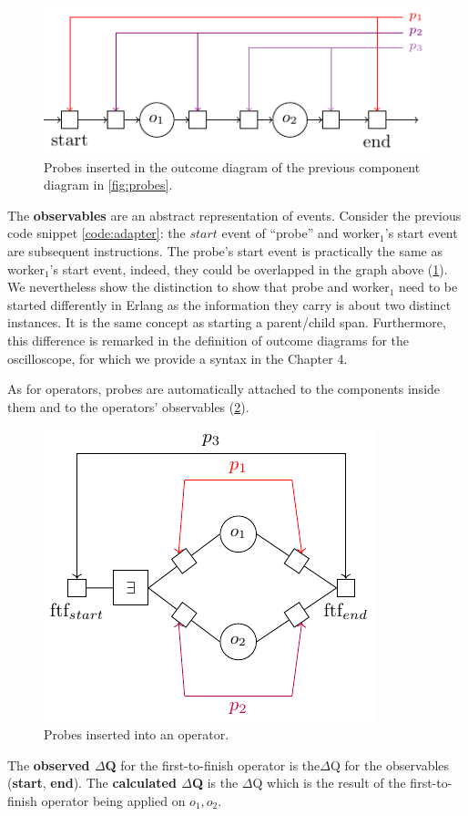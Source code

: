         \begin{figure}[H]
            \begin{center}
                \includegraphics[scale=1.3]{tikz/probe_1.pdf}
            \end{center}
            \caption{Probes inserted in the outcome diagram of the previous component diagram in \cref{fig:probes}.}
            \label{fig:probes_o}
        \end{figure}
       
    The \textbf{observables} are an abstract representation of events. Consider the previous code snippet \cref{code:adapter}: the $start$ event of ``probe'' and worker$_1$'s start event are subsequent instructions. The probe's start event is practically the same as worker$_1$'s start event, indeed, they could be overlapped in the graph above (\cref{fig:probes_o}). We nevertheless show the distinction to show that probe and worker$_1$ need to be started differently in Erlang as the information they carry is about two distinct instances. It is the same concept as starting a parent/child span. Furthermore, this difference is remarked in the definition of outcome diagrams for the oscilloscope, for which we provide a syntax in the Chapter 4. 
    
    As for operators, probes are automatically attached to the components inside them and to the operators' observables (\cref{fig:probes_op}). 

       \begin{figure}[H]
           \begin{center}
                \includegraphics[scale = 1.3]{tikz/probe_2.pdf}
            \end{center}
            \label{fig:probes_op}
            \caption{Probes inserted into an operator.}
       \end{figure}
    
    The \textbf{observed $\Delta$Q} for the first-to-finish operator is the$\Delta$Q for the observables (\textbf{start}, \textbf{end}). The \textbf{calculated $\Delta$Q} is the $\Delta$Q which is the result of the first-to-finish operator being applied on $o_1, o_2$.
